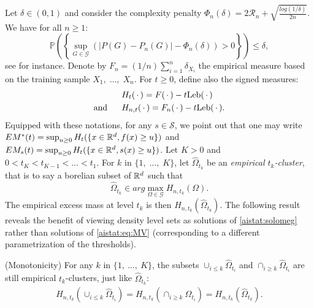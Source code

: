 Let $\delta\in (0,1)$ and consider the complexity penalty $\Phi_n(\delta)=2 \mathcal{R}_n + \sqrt{\frac{log(1/\delta)}{2n}}$. We have for all $n \ge 1$:
\begin{equation}
\label{aistat:penality}
\mathbb{P}\left( \left\{ \sup_{G\in \mathcal{G}}\left( |P(G)- P_n(G)|-\Phi_n(\delta) \right) >0 \right\}\right) \leq \delta,
\end{equation}
see \cite{Kolt06} for instance. Denote by $F_n=(1/n)\sum_{i=1}^n \delta_{X_i}$ the empirical measure based on the training sample $X_1,\; \ldots,\; X_n$. %
For $t \ge 0$, define also the signed measures:
\begin{align*}
&H_t(\,\cdot\,) =F(\,\cdot\,)-t \text{Leb}(\,\cdot\,)\\ 
\text{and ~~~~} &H_{n,t}(\,\cdot\,)=F_n(\,\cdot\,)-t \text{Leb}(\,\cdot\,).
\end{align*}
Equipped with these notations, for any $s \in \mathcal{S}$, we point out that one may write $EM^*(t)=\sup_{u \ge 0} H_t(\{x \in {\mathbb{R}^d}, f(x) \ge u\})$ and $EM_s(t)=\sup_{u \ge 0} H_{t}(\{x \in {\mathbb{R}^d}, s(x) \ge u\})$. Let $K>0$ and  $0<t_K<t_{K-1}<\ldots<t_1$. For $k$ in $\{1,\; \ldots,\; K\}$, let $\hat \Omega_{t_k}$ be an \textit{empirical $t_k$-cluster}, that is to say a borelian subset of $\mathbb{R}^d$ such that
$$\hat \Omega_{t_k} \in arg\max_{\Omega \in \mathcal{G}} H_{n,t_k}(\Omega).$$
The empirical excess mass at level $t_k$ is then $H_{n,t_k}(\hat \Omega_{t_k})$. The following result reveals the benefit of viewing density level sets as solutions of \eqref{aistat:solomeg} rather than solutions of \eqref{aistat:eq:MV} (corresponding to a different parametrization of the thresholds).

\begin{proposition} 
\label{aistat:propmono}{\sc (Monotonicity)}
For any $k$ in $\{1,~\ldots,~K\}$, the subsets $\cup_{i \le k}\hat \Omega_{t_i}$ and $\cap_{i \ge k} \hat \Omega_{t_i}$ are still empirical $t_k$-clusters, just like $\hat \Omega_{t_k}$: 
\begin{align*} 
H_{n,t_k}(\cup_{i \le k}\hat \Omega_{t_i})=H_{n,t_k}(\cap_{i \ge k}\hat \Omega_{t_i})=H_{n,t_k}(\hat \Omega_{t_k}).
\end{align*}
\end{proposition}

